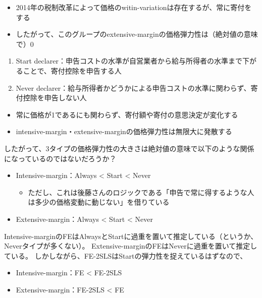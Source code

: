 \documentclass[
  11pt,
  a4paper,
]{article}
\providecommand{\tightlist}{%
  \setlength{\itemsep}{0pt}\setlength{\parskip}{0pt}}
\begin{document}
\begin{itemize}
\tightlist
\item
  2014年の税制改革によって価格のwitin-variationは存在するが、常に寄付をする
\item
  したがって、このグループのextensive-marginの価格弾力性は（絶対値の意味で）0
\end{itemize}

\begin{enumerate}
\def\labelenumi{\arabic{enumi}.}
\tightlist
\item
  Start declarer：申告コストの水準が自営業者から給与所得者の水準まで下がることで、寄付控除を申告する人
\item
  Never declarer：給与所得者かどうかによる申告コストの水準に関わらず、寄付控除を申告しない人
\end{enumerate}

\begin{itemize}
\tightlist
\item
  常に価格が1であるにも関わらず、寄付額や寄付の意思決定が変化する
\item
  intensive-margin・extensive-marginの価格弾力性は無限大に発散する
\end{itemize}

したがって、3タイプの価格弾力性の大きさは絶対値の意味で以下のような関係になっているのではないだろうか？

\begin{itemize}
\tightlist
\item
  Intensive-margin：Always \textless{} Start \textless{} Never

  \begin{itemize}
  \tightlist
  \item
    ただし、これは後藤さんのロジックである「申告で常に得するような人は多少の価格変動に動じない」を借りている
  \end{itemize}
\item
  Extensive-margin：Always \textless{} Start \textless{} Never
\end{itemize}

Intensive-marginのFEはAlwaysとStartに過重を置いて推定している（というか、Neverタイプが多くない）。
Extensive-marginのFEはNeverに過重を置いて推定している。
しかしながら、FE-2SLSはStartの弾力性を捉えているはずなので、

\begin{itemize}
\tightlist
\item
  Intensive-margin：FE \textless{} FE-2SLS
\item
  Extensive-margin：FE-2SLS \textless{} FE
\end{itemize}
\end{document}
